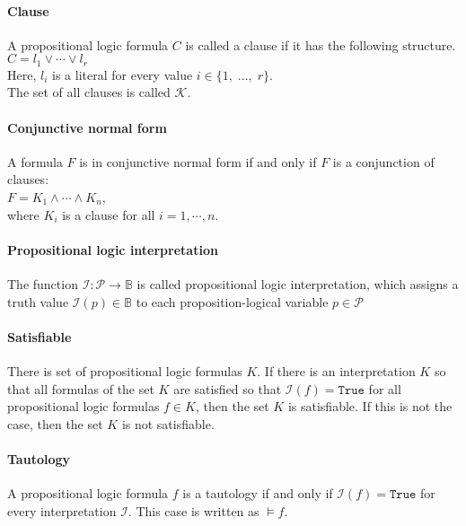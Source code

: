 \paragraph{Clause}
A propositional logic formula $C$ is called a clause if it has the following structure.
\\[0.2cm]
\hspace*{1.3cm} $C = l_1 \vee \cdots \vee l_r$ \\[0.2cm] Here, $l_i$ is a literal for every value $i \in \{1,\; ...,\; r\}$.
\\[0.2cm]
The set of all clauses is called $\mathcal{K}$.

\paragraph{Conjunctive normal form} A formula $F$ is in conjunctive normal form if and only if $F$ is a conjunction of clauses:
\\[0.2cm]
\hspace*{1.3cm} $F = K_1 \land \cdots \land K_n$, \\[0.2cm]
where $K_i$ is a clause for all $i = 1, \cdots, n$.

\paragraph{Propositional logic interpretation}
The function $\mathcal{I} : \mathcal{P} \rightarrow \mathbb{B}$ is called propositional logic interpretation, which assigns a truth value $\mathcal{I}(p) \in \mathbb{B}$ to each proposition-logical variable $p\in \mathcal{P}$

\paragraph{Satisfiable}
There is set of propositional logic formulas $K$. If there is an interpretation $K$ so that all formulas of the set $K$ are satisfied so that $\mathcal{I}(f) = \texttt{True}$ for all propositional logic formulas $f \in K$, then the set $K$ is satisfiable. If this is not the case, then the set $K$ is not satisfiable.

\paragraph{Tautology}
A propositional logic formula $f$ is a tautology if and only if $\mathcal{I}(f) = \texttt{True}$ for every interpretation $\mathcal{I}$. This case is written as $\models f$.

